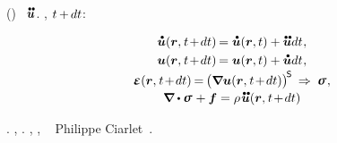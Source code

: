 ()
~$\mathdotdotabove{\bm{u}}$.
,
 
${ t \hspace{-0.1ex} + \hspace{-0.15ex} dt }$:

\nopagebreak
\begin{gather*}
\mathdotabove{\bm{u}} ({\bm{r}, \hspace{.1ex} t \hspace{-0.3ex} + \hspace{-0.3ex} dt})
\hspace{-0.2ex} =
\mathdotabove{\bm{u}}(\bm{r}, t) + \mathdotdotabove{\bm{u}} dt \hspace{.1ex} , \\
\bm{u}({ \bm{r}, \hspace{.1ex} t \hspace{-0.3ex} + \hspace{-0.3ex} dt })
\hspace{-0.2ex} =
\bm{u}(\bm{r}, t)
+ \mathdotabove{\bm{u}} dt
\hspace{.1ex} ,
\\[-0.1em]
%
\infinitesimaldeformation({\bm{r}, \hspace{.1ex} t \hspace{-0.3ex} + \hspace{-0.3ex} dt})
\hspace{-0.2ex} = \hspace{-0.2ex}
\bigl( \boldnabla \bm{u}{( \bm{r}, \hspace{.1ex} t \hspace{-0.3ex} + \hspace{-0.3ex} dt )} \bigr)^{\hspace{-0.25ex}\mathsf{S}}
\hspace{.2em} \Rightarrow \hspace{.25em}
\linearstress
\hspace{.1ex} ,
\\[-0.1em]
%
\boldnabla \dotp \linearstress \hspace{.15ex} + \bm{f}
= \rho \hspace{.2ex} \mathdotdotabove{\bm{u}}( \bm{r}, \hspace{.1ex} t \hspace{-0.3ex} + \hspace{-0.3ex} dt )
\end{gather*}

\vspace{-0.1em}\noindent
{}.
,
.
,
,
~ Philippe Ciarlet~\cite{ciarlet-mathematicalelasticity}.
